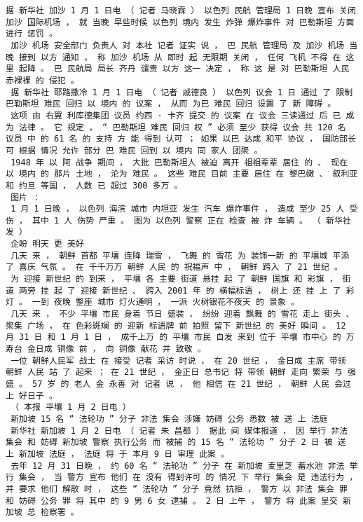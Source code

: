 \documentclass{article}
\begin{document}
\begin{Verbatim}[commandchars=\\\{\}]
 据 新华社 加沙 1 月 1 日电 （ 记者 马晓霖 ） 以色列 民航 管理局 1 日晚 宣布 关闭 加沙 国际机场 ， 就 当晚 早些时候 以色列 境内 发生 炸弹 爆炸事件 对 巴勒斯坦 方面 进行 惩罚 。 
 加沙 机场 安全部门 负责人 对 本社 记者 证实 说 ， 巴 民航 管理局 及 加沙 机场 当晚 接到 以方 通知 ， 称 加沙 机场 从 即时 起 无限期 关闭 ， 任何 飞机 不得 在 这里 起降 。 巴 民航局 局长 齐丹 谴责 以方 这一 决定 ， 称 这 是 对 巴勒斯坦 人民 赤裸裸 的 侵犯 。 
 据 新华社 耶路撒冷 1 月 1 日电 （ 记者 戚德良 ） 以色列 议会 1 日 通过 了 限制 巴勒斯坦 难民 回归 以 境内 的 议案 ， 从而 为巴 难民 回归 设置 了 新 障碍 。 
 这项 由 右翼 利库德集团 议员 约西 · 卡齐 提交 的 议案 在 议会 三读通过 后 已 成为 法律 。 它 规定 ， “ 巴勒斯坦 难民 回归 权 ” 必须 至少 获得 议会 共 120 名 议员 中 的 61 名 的 支持 方 能 得到 认可 ； 如果 以巴 达成 和平 协议 ， 国防部长 可 根据 情况 允许 部分 巴 难民 回到 以 境内 同 家人 团聚 。 
 1948 年 以 阿 战争 期间 ， 大批 巴勒斯坦人 被迫 离开 祖祖辈辈 居住 的 、 现在 以 境内 的 那片 土地 ， 沦为 难民 。 这些 难民 目前 主要 居住 在 黎巴嫩 、 叙利亚 和 约旦 等国 ， 人数 已 超过 300 多万 。 
 图片 ： 
 1 月 1 日晚 ， 以色列 海滨 城市 内坦亚 发生 汽车 爆炸事件 ， 造成 至少 25 人 受伤 ， 其中 1 人 伤势 严重 。 图为 以色列 警察 正在 检查 被 炸 车辆 。 （ 新华社 发 ） 
 企盼 明天 更 美好 
 几天 来 ， 朝鲜 首都 平壤 连降 瑞雪 ， 飞舞 的 雪花 为 装饰一新 的 平壤城 平添 了 喜庆 气氛 。 在 千千万万 朝鲜 人民 的 祝福声 中 ， 朝鲜 跨入 了 21 世纪 。 
 为 迎接 新世纪 的 到来 ， 平壤 各 主要 街道 悬挂 起 了 朝鲜 国旗 和 彩旗 ， 街道 两旁 挂 起 了 迎接 新世纪 、 跨入 2001 年 的 横幅标语 ， 树上 还 挂 上 了 彩灯 。 一到 夜晚 整座 城市 灯火通明 ， 一派 火树银花不夜天 的 景象 。 
 几天 来 ， 不少 平壤 市民 身着 节日 盛装 ， 纷纷 迎着 飘舞 的 雪花 走上 街头 、 聚集 广场 ， 在 色彩斑斓 的 迎新 标语牌 前 拍照 留下 新世纪 的 美好 瞬间 。 12 月 31 日 和 1 月 1 日 ， 成千上万 的 平壤 市民 自发 来到 位于 平壤 市中心 的 万寿台 金日成 铜像 前 ， 向 铜像 献花 并 致敬 。 
 一位 朝鲜人民军 战士 在 接受 记者 采访 时说 ， 在 20 世纪 ， 金日成 主席 带领 朝鲜 人民 站 了 起来 ； 在 21 世纪 ， 金正日 总书记 将 带领 朝鲜 走向 繁荣 与 强盛 。 57 岁 的 老人 金 永善 对 记者 说 ， 他 相信 在 21 世纪 ， 朝鲜 人民 会过 上 好日子 。 
 （ 本报 平壤 1 月 2 日电 ） 
 新加坡 15 名 “ 法轮功 ” 分子 非法 集会 涉嫌 妨碍 公务 悉数 被 送 上 法庭 
 新华社 新加坡 1 月 2 日电 （ 记者 朱 昌都 ） 据此 间 媒体报道 ， 因 举行 非法 集会 和 妨碍 新加坡 警察 执行公务 而 被捕 的 15 名 “ 法轮功 ” 分子 2 日 被 送 上 新加坡 法庭 ， 法庭 将 于 本月 9 日 审理 此案 。 
 去年 12 月 31 日晚 ， 约 60 名 “ 法轮功 ” 分子 在 新加坡 麦里芝 蓄水池 非法 举行 集会 ， 当 警方 宣布 他们 在 没有 得到许可 的 情况 下 举行 集会 是 违法行为 ， 并 要求 他们 解散 时 ， 这些 “ 法轮功 ” 分子 竟然 抗拒 ， 警方 以 非法 集会 罪 和 妨碍 公务 罪 将 其中 的 9 男 6 女 逮捕 。 2 日 上午 ， 警方 将 此案 呈交 新加坡 总 检察署 。 

\end{Verbatim}
\end{document}
